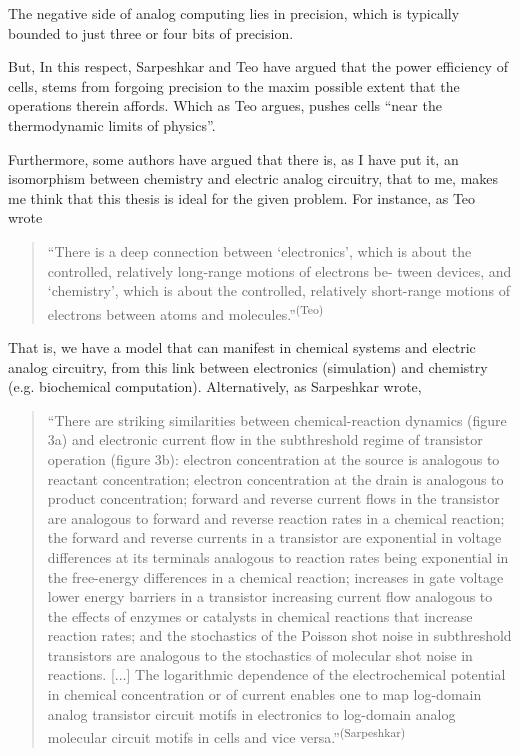 The negative side of analog computing lies in precision, which is typically bounded to just three or four bits of precision.

But, In this respect, Sarpeshkar and Teo have argued that the power efficiency of cells, stems from forgoing precision to the maxim possible extent that the operations therein affords. Which as Teo argues, pushes cells ``near the thermodynamic limits of physics''. 

Furthermore, some authors have argued that there is, as I have put it, an isomorphism between chemistry and electric analog circuitry, that to me, makes me think that this thesis is ideal for the given problem. For instance, as Teo wrote
\begin{quotation}
    ``There is a deep connection between ‘electronics’, which is about the controlled, relatively long-range motions of electrons be- tween devices, and ‘chemistry’, which is about the controlled, relatively short-range motions of electrons between atoms and molecules.''\textsuperscript{(Teo)}
\end{quotation}

That is, we have a model that can manifest in chemical systems and electric analog circuitry, from this link between electronics (simulation) and chemistry (e.g. biochemical computation). Alternatively, as Sarpeshkar wrote,
\begin{quotation}
    ``There are striking similarities between chemical-reaction dynamics (figure 3a) and electronic current flow in the subthreshold regime of transistor operation (figure 3b): electron concentration at the source is analogous to reactant concentration; electron concentration at the drain is analogous to product concentration; forward and reverse current flows in the transistor are analogous to forward and reverse reaction rates in a chemical reaction; the forward and reverse currents in a transistor are exponential in voltage differences at its terminals analogous to reaction rates being exponential in the free-energy differences in a chemical reaction; increases in gate voltage lower energy barriers in a transistor increasing current flow analogous to the effects of enzymes or catalysts in chemical reactions that increase reaction rates; and the stochastics of the Poisson shot noise in subthreshold transistors are analogous to the stochastics of molecular shot noise in reactions. [...] The logarithmic dependence of the electrochemical potential in chemical concentration or of current enables one to map log-domain analog transistor circuit motifs in electronics to log-domain analog molecular circuit motifs in cells and vice versa.''\textsuperscript{(Sarpeshkar)}
\end{quotation}


